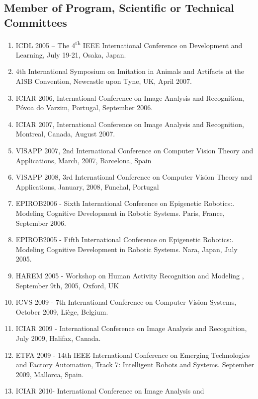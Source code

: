 \documentclass[
]{article}
\begin{document}
\subsection{Member of Program, Scientific or Technical
Committees}\label{member-of-program-scientific-or-technical-committees}

\begin{enumerate}
\def\labelenumi{\arabic{enumi}.}
\item
  ICDL 2005 -- The 4\textsuperscript{th} IEEE International Conference
  on Development and Learning, July 19-21, Osaka, Japan.
\item
  4th International Symposium on Imitation in Animals and Artifacts at
  the AISB Convention, Newcastle upon Tyne, UK, April
  2007.
\item
  ICIAR 2006, International Conference on Image Analysis and
  Recognition, Póvoa do Varzim, Portugal, September 2006.
\item
  ICIAR 2007, International Conference on Image Analysis and
  Recognition, Montreal, Canada, August 2007.
\item
  VISAPP 2007, 2nd International Conference on Computer Vision Theory
  and Applications, March, 2007, Barcelona, Spain
\item
  VISAPP 2008, 3rd International Conference on Computer Vision Theory
  and Applications, January, 2008, Funchal, Portugal
\item
  EPIROB2006 - Sixth International Conference on Epigenetic Robotics:.
  Modeling Cognitive Development in Robotic Systems. Paris, France,
  September 2006.
\item
  EPIROB2005 - Fifth International Conference on Epigenetic Robotics:.
  Modeling Cognitive Development in Robotic Systems. Nara, Japan, July
  2005.
\item
  HAREM 2005 - Workshop on Human Activity Recognition and Modeling ,
  September 9th, 2005, Oxford, UK
\item
  ICVS 2009 - 7th International Conference on Computer Vision Systems,
  October 2009, Liège, Belgium.
\item
  ICIAR 2009 - International Conference on Image Analysis and
  Recognition, July 2009, Halifax, Canada.
\item
  ETFA 2009 - 14th IEEE International Conference on Emerging
  Technologies and Factory Automation, Track 7: Intelligent Robots and
  Systems. September 2009, Mallorca, Spain.
\item
  ICIAR 2010- International Conference on Image Analysis and

\end{enumerate}
\end{document}
